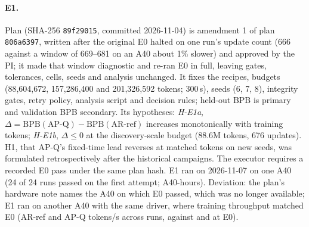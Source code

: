 \documentclass{article}
\begin{document}
\paragraph{E1.} Plan  (SHA-256 \texttt{89f29015}, committed 2026-11-04) is amendment 1 of plan \texttt{806a6397}, written after the original E0 halted on one run's update count (666 against a window of 669--681 on an A40 about 1\% slower) and approved by the PI; it made that window diagnostic and re-ran E0 in full, leaving gates, tolerances, cells, seeds and analysis unchanged. It fixes the recipes, budgets (88,604,672, 157,286,400 and 201,326,592 tokens; 300\,s), seeds (6, 7, 8), integrity gates, retry policy, analysis script and decision rules; held-out BPB is primary and validation BPB secondary. Its hypotheses: \emph{H-E1a}, $\Delta=\mathrm{BPB}(\text{AP-Q})-\mathrm{BPB}(\text{AR-ref})$ increases monotonically with training tokens; \emph{H-E1b}, $\Delta\le0$ at the discovery-scale budget (88.6M tokens, 676 updates). H1, that AP-Q's fixed-time lead reverses at matched tokens on new seeds, was formulated retrospectively after the historical campaigns. The executor requires a recorded E0 pass under the same plan hash. E1 ran on 2026-11-07 on one A40 (24 of 24 runs passed on the first attempt; \CREOneHours{} A40-hours). Deviation: the plan's hardware note names the A40 on which E0 passed, which was no longer available; E1 ran on another A40 with the same driver, where training throughput matched E0 (AR-ref \CREOneTputAR{} and AP-Q \CREOneTputAP{} tokens/s across runs, against \CREZeroTputAR{} and \CREZeroTputAP{} at E0).
\end{document}
